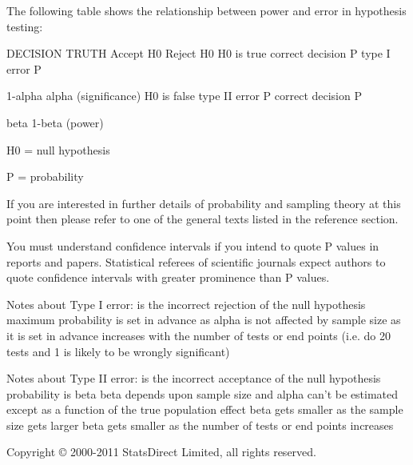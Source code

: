 The following table shows the relationship between power and error in hypothesis testing:
 
 
DECISION
TRUTH
Accept H0
Reject H0
H0 is true
correct decision P
type I error P
 
1-alpha
alpha (significance)
H0 is false
type II error P
correct decision P
 
beta
1-beta (power)
 
 
 
H0 = null hypothesis
 
 
P = probability
 
 
 
If you are interested in further details of probability and sampling theory at this point then please refer to one of the general texts listed in the reference section.
 
You must understand confidence intervals if you intend to quote P values in reports and papers. Statistical referees of scientific journals expect authors to quote confidence intervals with greater prominence than P values.
 
Notes about Type I error:
is the incorrect rejection of the null hypothesis
maximum probability is set in advance as alpha
is not affected by sample size as it is set in advance
increases with the number of tests or end points (i.e. do 20 tests and 1 is likely to be wrongly significant)
 
Notes about Type II error:
is the incorrect acceptance of the null hypothesis
probability is beta
beta depends upon sample size and alpha
can't be estimated except as a function of the true population effect
beta gets smaller as the sample size gets larger
beta gets smaller as the number of tests or end points increases
 
Copyright © 2000-2011 StatsDirect Limited, all rights reserved.
